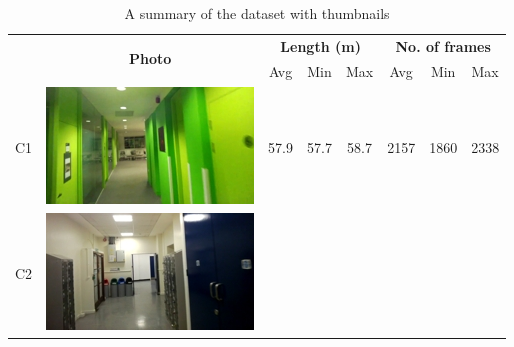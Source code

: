 \begin{table}[ht]
\caption{A summary of the dataset with thumbnails}
\label{tbl:Datasets}

\begin{center}

\centering
    \begin{tabular}{l c c c c c c c}
    \hline
    & \multirow{2}{*}{\bf{Photo}} & \multicolumn{3}{c}{\bf{Length (m)}} & \multicolumn{3}{c}{\bf{No. of frames}}  \\ \cline{3-8}
             & ~     & Avg    & Min   & Max   & Avg              & Min  & Max  \\ \hline
    C1       & \begin{minipage}{.1\textwidth}
      			\includegraphics[width=\linewidth]{./gfx/Chapter04/table/1.jpg}
			   \end{minipage}
			        & 57.9  & 57.7 & 58.7 & 2157         & 1860 & 2338 \\ \hline
    C2       & \begin{minipage}{.1\textwidth}
      			\includegraphics[width=\linewidth]{./gfx/Chapter04/table/2.jpg}
			   \end{minipage}

\end{tabular}
\end{center}
\end{table}
